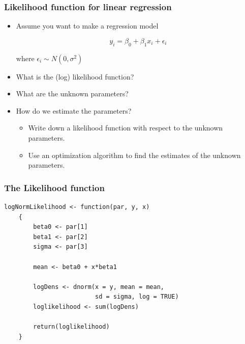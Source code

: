 \documentclass[10pt]{beamer}
\begin{document}









\begin{frame}
  \frametitle{Likelihood function for linear regression}
  \begin{itemize}
  \item Assume you want to make a regression model

    \begin{equation*}
      y_i = \beta_0 + \beta_1 x_i + \epsilon_i
    \end{equation*}

    where $\epsilon_i \sim N(0, \sigma^2)$

  \item What is the (log) likelihood function?

  \item What are the unknown parameters?

  \item How do we estimate the parameters?


    \begin{itemize}
    \item Write down a likelihood function with respect to the
      unknown parameters.

    \item Use an optimization algorithm to find the estimates of the
      unknown parameters.

    \end{itemize}

  \end{itemize}

\end{frame}

\begin{frame}[fragile]
\frametitle{The Likelihood function}

\begin{verbatim}
logNormLikelihood <- function(par, y, x)
    {
        beta0 <- par[1]
        beta1 <- par[2]
        sigma <- par[3]

        mean <- beta0 + x*beta1

        logDens <- dnorm(x = y, mean = mean,
                         sd = sigma, log = TRUE)
        loglikelihood <- sum(logDens)

        return(loglikelihood)
    }
\end{verbatim}

\end{frame}
\end{document}
